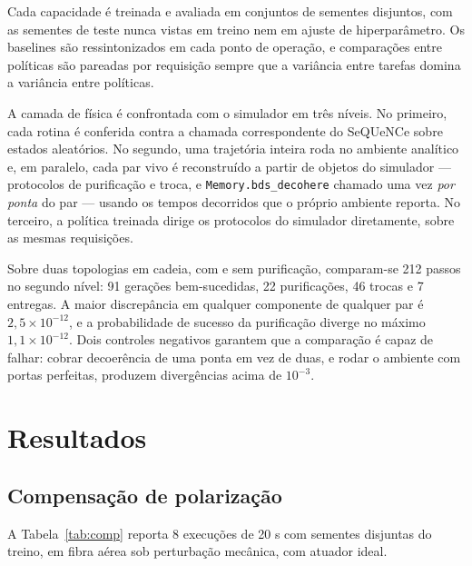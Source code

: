 \documentclass[12pt]{article}
\begin{document}
Cada capacidade é treinada e avaliada em conjuntos de sementes disjuntos, com
as sementes de teste nunca vistas em treino nem em ajuste de hiperparâmetro. Os
baselines são ressintonizados em cada ponto de operação, e comparações entre
políticas são pareadas por requisição sempre que a variância entre tarefas
domina a variância entre políticas.

A camada de física é confrontada com o simulador em três níveis. No primeiro,
cada rotina é conferida contra a chamada correspondente do SeQUeNCe sobre
estados aleatórios. No segundo, uma trajetória inteira roda no ambiente
analítico e, em paralelo, cada par vivo é reconstruído a partir de objetos do
simulador --- protocolos de purificação e troca, e \texttt{Memory.bds\_decohere}
chamado uma vez \emph{por ponta} do par --- usando os tempos decorridos que o
próprio ambiente reporta. No terceiro, a política treinada dirige os protocolos
do simulador diretamente, sobre as mesmas requisições.

Sobre duas topologias em cadeia, com e sem purificação, comparam-se 212 passos
no segundo nível: 91 gerações bem-sucedidas, 22 purificações, 46 trocas e 7
entregas. A maior discrepância em qualquer componente de qualquer par é
$2{,}5\times10^{-12}$, e a probabilidade de sucesso da purificação diverge no
máximo $1{,}1\times10^{-12}$. Dois controles negativos garantem que a
comparação é capaz de falhar: cobrar decoerência de uma ponta em vez de duas, e
rodar o ambiente com portas perfeitas, produzem divergências acima de
$10^{-3}$.

\section{Resultados}

\subsection{Compensação de polarização}

A Tabela~\ref{tab:comp} reporta 8 execuções de 20 s com sementes disjuntas do
treino, em fibra aérea sob perturbação mecânica, com atuador ideal.
\end{document}
